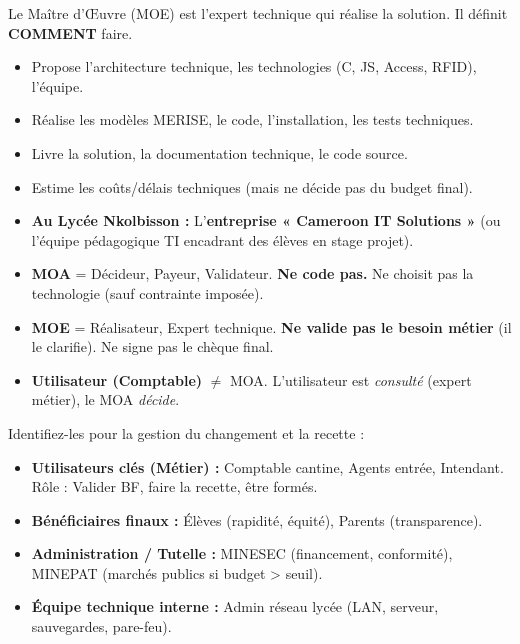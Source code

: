 \documentclass[11pt]{article}
\newcommand{\cle}[1]{{\popxbold\color{popdark}#1}}
\begin{document}
\begin{definition}
Le \cle{Maître d'Œuvre (MOE)} est l'expert technique qui réalise la solution. Il définit \textbf{COMMENT} faire.
\begin{itemize}
    \item Propose l'architecture technique, les technologies (C, JS, Access, RFID), l'équipe.
    \item Réalise les modèles MERISE, le code, l'installation, les tests techniques.
    \item Livre la solution, la documentation technique, le code source.
    \item Estime les coûts/délais techniques (mais ne décide pas du budget final).
    \item \textbf{Au Lycée Nkolbisson :} L'\textbf{entreprise « Cameroon IT Solutions »} (ou l'équipe pédagogique TI encadrant des élèves en stage projet).
\end{itemize}
\end{definition}

\begin{attention}
\begin{itemize}
    \item \textbf{MOA} = Décideur, Payeur, Validateur. \textbf{Ne code pas.} Ne choisit pas la technologie (sauf contrainte imposée).
    \item \textbf{MOE} = Réalisateur, Expert technique. \textbf{Ne valide pas le besoin métier} (il le clarifie). Ne signe pas le chèque final.
    \item \textbf{Utilisateur (Comptable)} $\neq$ MOA. L'utilisateur est \emph{consulté} (expert métier), le MOA \emph{décide}.
\end{itemize}
\end{attention}

\begin{propriete}
Identifiez-les pour la gestion du changement et la recette :
\begin{itemize}
    \item \textbf{Utilisateurs clés (Métier) :} Comptable cantine, Agents entrée, Intendant. Rôle : Valider BF, faire la recette, être formés.
    \item \textbf{Bénéficiaires finaux :} Élèves (rapidité, équité), Parents (transparence).
    \item \textbf{Administration / Tutelle :} MINESEC (financement, conformité), MINEPAT (marchés publics si budget > seuil).
    \item \textbf{Équipe technique interne :} Admin réseau lycée (LAN, serveur, sauvegardes, pare-feu).
\end{itemize}
\end{propriete}
\end{document}
